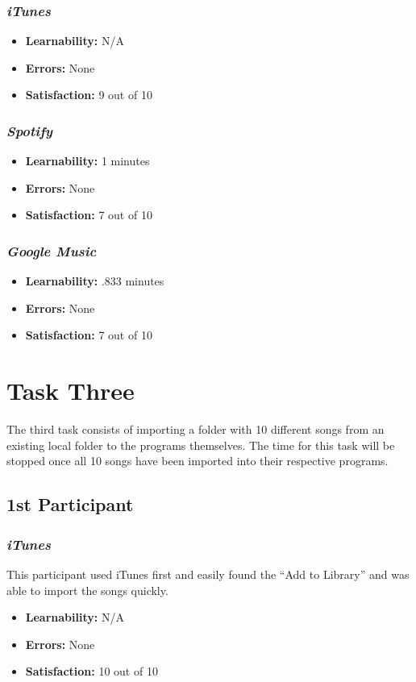 \documentclass{article}
\begin{document}
{\begin{multicols}{2}
\subsubsection{\it iTunes}
\begin{itemize}
	\item {\bf Learnability:} N/A
	\item {\bf Errors:} None
	\item {\bf Satisfaction:} 9 out of 10 
\end{itemize}

\subsubsection{\it Spotify}
\begin{itemize}
	\item {\bf Learnability:} 1 minutes
	\item {\bf Errors:} None
	\item {\bf Satisfaction:} 7 out of 10 
\end{itemize}

\subsubsection{\it Google Music}
\begin{itemize}
\item {\bf Learnability:} .833 minutes
	\item {\bf Errors:} None
	\item {\bf Satisfaction:} 7 out of 10 
\end{itemize}
\end{multicols}

\section{Task Three}
The third task consists of importing a folder with 10 different songs from an existing local folder to the programs themselves. The time for this task will be stopped once all 10 songs have been imported into their respective programs.

\begin{multicols}{2}
\subsection{1st Participant}

\subsubsection{\it iTunes}
This participant used iTunes first and easily found the “Add to Library” and was able to import the songs quickly.
\begin{itemize}
	\item {\bf Learnability:} N/A
	\item {\bf Errors:}  None
	\item {\bf Satisfaction:} 10 out of 10 
\end{itemize}


\end{multicols}}
\end{document}
